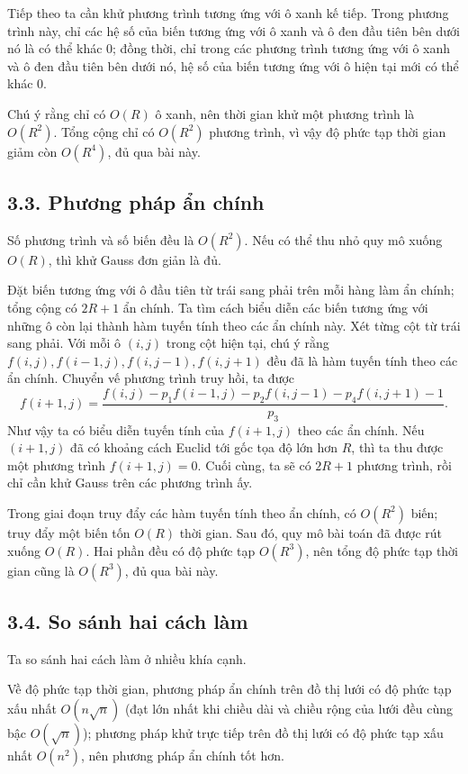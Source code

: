 \documentclass[11pt]{article}
\begin{document}
Tiếp theo ta cần khử phương trình tương ứng với ô xanh kế tiếp. Trong phương
trình này, chỉ các hệ số của biến tương ứng với ô xanh và ô đen đầu tiên bên
dưới nó là có thể khác \(0\); đồng thời, chỉ trong các phương trình tương ứng
với ô xanh và ô đen đầu tiên bên dưới nó, hệ số của biến tương ứng với ô hiện
tại mới có thể khác \(0\).

Chú ý rằng chỉ có \(O(R)\) ô xanh, nên thời gian khử một phương trình là
\(O(R^2)\). Tổng cộng chỉ có \(O(R^2)\) phương trình, vì vậy độ phức tạp thời
gian giảm còn \(O(R^4)\), đủ qua bài này.

\subsection*{3.3. Phương pháp ẩn chính}

Số phương trình và số biến đều là \(O(R^2)\). Nếu có thể thu nhỏ quy mô xuống
\(O(R)\), thì khử Gauss đơn giản là đủ.

Đặt biến tương ứng với ô đầu tiên từ trái sang phải trên mỗi hàng làm ẩn
chính; tổng cộng có \(2R+1\) ẩn chính. Ta tìm cách biểu diễn các biến tương
ứng với những ô còn lại thành hàm tuyến tính theo các ẩn chính này. Xét từng
cột từ trái sang phải. Với mỗi ô \((i,j)\) trong cột hiện tại, chú ý rằng
\(f(i,j),f(i-1,j),f(i,j-1),f(i,j+1)\) đều đã là hàm tuyến tính theo các ẩn
chính. Chuyển vế phương trình truy hồi, ta được
\[
  f(i+1,j)=
  \frac{f(i,j)-p_1f(i-1,j)-p_2f(i,j-1)-p_4f(i,j+1)-1}{p_3}.
\]
Như vậy ta có biểu diễn tuyến tính của \(f(i+1,j)\) theo các ẩn chính. Nếu
\((i+1,j)\) đã có khoảng cách Euclid tới gốc tọa độ lớn hơn \(R\), thì ta thu
được một phương trình \(f(i+1,j)=0\). Cuối cùng, ta sẽ có \(2R+1\) phương
trình, rồi chỉ cần khử Gauss trên các phương trình ấy.

Trong giai đoạn truy đẩy các hàm tuyến tính theo ẩn chính, có \(O(R^2)\) biến;
truy đẩy một biến tốn \(O(R)\) thời gian. Sau đó, quy mô bài toán đã được rút
xuống \(O(R)\). Hai phần đều có độ phức tạp \(O(R^3)\), nên tổng độ phức tạp
thời gian cũng là \(O(R^3)\), đủ qua bài này.

\subsection*{3.4. So sánh hai cách làm}

Ta so sánh hai cách làm ở nhiều khía cạnh.

Về độ phức tạp thời gian, phương pháp ẩn chính trên đồ thị lưới có độ phức tạp
xấu nhất \(O(n\sqrt n)\) (đạt lớn nhất khi chiều dài và chiều rộng của lưới đều
cùng bậc \(O(\sqrt n)\)); phương pháp khử trực tiếp trên đồ thị lưới có độ
phức tạp xấu nhất \(O(n^2)\), nên phương pháp ẩn chính tốt hơn.
\end{document}
